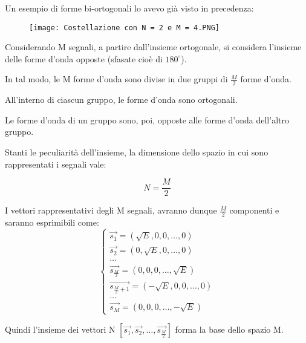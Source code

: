 Un esempio di forme bi-ortogonali lo avevo già visto in precedenza: 

\begin{figure}[h]
    \centering
    \texttt{[image: Costellazione con N = 2 e M = 4.PNG]}
\end{figure}

Considerando M segnali, 
a partire dall'insieme ortogonale, 
si considera l'insieme delle forme d'onda opposte (sfasate cioè di $180^{\circ}$). \newline 

In tal modo, le M forme d'onda sono divise in due gruppi di $\frac{M}{2}$ forme d'onda. \newline 

All'interno di ciascun gruppo, 
le forme d'onda sono ortogonali. \newline 

Le forme d'onda di un gruppo sono, poi, opposte alle forme d'onda dell'altro gruppo. \newline 

Stanti le peculiarità dell'insieme, 
la dimensione dello spazio in cui sono rappresentati i segnali vale: 

{
    \Large 
    \begin{equation}
        N = \frac{M}{2}
    \end{equation}
}

I vettori rappresentativi degli M segnali, avranno dunque $\frac{M}{2}$ componenti e saranno esprimibili come: 
{
    \Large 
    \begin{equation}
        \begin{cases}
        \overrightarrow{s_1} = \left( \sqrt{E}, 0, 0, \dots, 0 \right)  
        \\
        \overrightarrow{s_2} = \left( 0 , \sqrt{E}, 0, \dots, 0 \right)  
        \\
        \dots
        \\
        \overrightarrow{s_{\frac{M}{2}}} = \left( 0 , 0, 0, \dots, \sqrt{E} \right)  
        \\
        \overrightarrow{s_{\frac{M}{2} + 1}} = \left( - \sqrt{E}, 0, 0, \dots, 0 \right)  
        \\
        \dots
        \\
        \overrightarrow{s_{M}} = \left( 0 , 0, 0, \dots, - \sqrt{E} \right)  
    \end{cases}
    \end{equation}
}

Quindi l'insieme dei vettori N $[\overrightarrow{s_1}, \overrightarrow{s_2}, \dots, \overrightarrow{s_{\frac{M}{2}}} ]$ 
forma la base dello spazio M. \newline 

